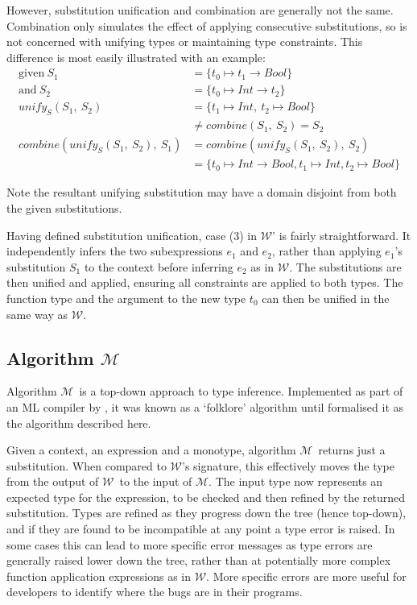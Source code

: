 \documentclass[a4paper,fleqn,oneside,12pt]{report}
\newcommand{\W}{$\mathcal{W}$}
\newcommand{\M}{$\mathcal{M}$}
\begin{document}
However, substitution unification and combination are generally not the same. Combination only simulates the effect of applying consecutive substitutions, so is not concerned with unifying types or maintaining type constraints. This difference is most easily illustrated with an example:
\begin{align*}
  \mathrm{given}\ S_1                        & = \{ t_0 \mapsto t_1 \rightarrow Bool \}\\
  \mathrm{and}\ S_2                          & = \{ t_0 \mapsto Int \rightarrow t_2 \}\\[0.25cm]
  \mathit{unify_S}(S_1,\ S_2)                & = \{ t_1 \mapsto Int,\ t_2 \mapsto Bool \}\\
                                             & \neq \mathit{combine}(S_1,\ S_2) = S_2\\[0.25cm]
  combine(\mathit{unify_S}(S_1,\ S_2),\ S_1) & = combine(\mathit{unify_S}(S_1,\ S_2),\ S_2)\\
                                             & = \{ t_0 \mapsto Int \rightarrow Bool, t_1 \mapsto Int, t_2 \mapsto Bool \}
\end{align*}

Note the resultant unifying substitution may have a domain disjoint from both the given substitutions.

Having defined substitution unification, case (3) in \W' is fairly straightforward. It independently infers the two subexpressions $e_1$ and $e_2$, rather than applying $e_1$'s substitution $S_1$ to the context before inferring $e_2$ as in \W. The substitutions are then unified and applied, ensuring all constraints are applied to both types. The function type and the argument to the new type $t_0$ can then be unified in the same way as \W.

\subsection{Algorithm \texorpdfstring{\M}{M}}

Algorithm \M\ is a top-down approach to type inference. Implemented as part of an ML compiler by \cite{ref32}, it was known as a `folklore' algorithm until \cite{ref27} formalised it as the algorithm described here.

Given a context, an expression and a monotype, algorithm \M\ returns just a substitution. When compared to \W's signature, this effectively moves the type from the output of \W\ to the input of \M. The input type now represents an expected type for the expression, to be checked and then refined by the returned substitution. Types are refined as they progress down the tree (hence top-down), and if they are found to be incompatible at any point a type error is raised. In some cases this can lead to more specific error messages as type errors are generally raised lower down the tree, rather than at potentially more complex function application expressions as in \W. More specific errors are more useful for developers to identify where the bugs are in their programs.
\end{document}
